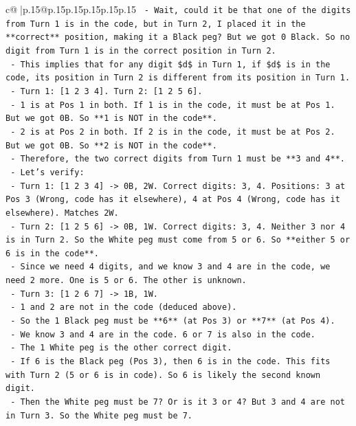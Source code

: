 \documentclass{article}
\begin{document}
{\begin{supertabular}{c@{$\;$}|p{.15\linewidth}@{}p{.15\linewidth}p{.15\linewidth}p{.15\linewidth}p{.15\linewidth}p{.15\linewidth}}
{{{\texttt{  {-} Wait, could it be that one of the digits from Turn 1 is in the code, but in Turn 2, I placed it in the **correct** position, making it a Black peg? But we got 0 Black. So no digit from Turn 1 is in the correct position in Turn 2.} \\
\texttt{  {-} This implies that for any digit \$d\$ in Turn 1, if \$d\$ is in the code, its position in Turn 2 is different from its position in Turn 1.} \\
\texttt{  {-} Turn 1: {[}1 2 3 4{]}. Turn 2: {[}1 2 5 6{]}.} \\
\texttt{  {-} 1 is at Pos 1 in both. If 1 is in the code, it must be at Pos 1. But we got 0B. So **1 is NOT in the code**.} \\
\texttt{  {-} 2 is at Pos 2 in both. If 2 is in the code, it must be at Pos 2. But we got 0B. So **2 is NOT in the code**.} \\
\texttt{  {-} Therefore, the two correct digits from Turn 1 must be **3 and 4**.} \\
\texttt{  {-} Let's verify:} \\
\texttt{    {-} Turn 1: {[}1 2 3 4{]} {-}> 0B, 2W. Correct digits: 3, 4. Positions: 3 at Pos 3 (Wrong, code has it elsewhere), 4 at Pos 4 (Wrong, code has it elsewhere). Matches 2W.} \\
\texttt{    {-} Turn 2: {[}1 2 5 6{]} {-}> 0B, 1W. Correct digits: 3, 4. Neither 3 nor 4 is in Turn 2. So the White peg must come from 5 or 6. So **either 5 or 6 is in the code**.} \\
\texttt{    {-} Since we need 4 digits, and we know 3 and 4 are in the code, we need 2 more. One is 5 or 6. The other is unknown.} \\
\texttt{  {-} Turn 3: {[}1 2 6 7{]} {-}> 1B, 1W.} \\
\texttt{    {-} 1 and 2 are not in the code (deduced above).} \\
\texttt{    {-} So the 1 Black peg must be **6** (at Pos 3) or **7** (at Pos 4).} \\
\texttt{    {-} We know 3 and 4 are in the code. 6 or 7 is also in the code.} \\
\texttt{    {-} The 1 White peg is the other correct digit.} \\
\texttt{    {-} If 6 is the Black peg (Pos 3), then 6 is in the code. This fits with Turn 2 (5 or 6 is in code). So 6 is likely the second known digit.} \\
\texttt{    {-} Then the White peg must be 7? Or is it 3 or 4? But 3 and 4 are not in Turn 3. So the White peg must be 7.} \\
}}}
\end{supertabular}}
\end{document}
